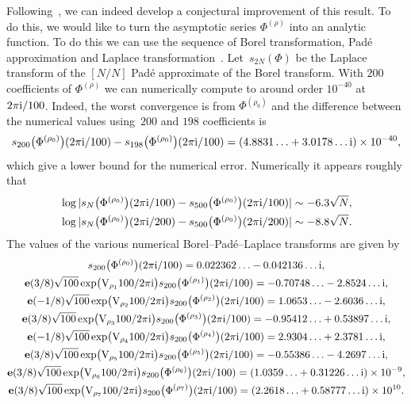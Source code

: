 \documentclass[pdftex]{sigma}
\numberwithin{equation}{section}
\def\be{\begin{equation}}
\def\ee{\end{equation}}
\def\e{\mathbf e}
\def\VC{\mathrm{VC}}
\def\be{\begin{equation}}
\def\ee{\end{equation}}
\def\VC{\mathrm{V}}
\def\triv{\rho_0}
\begin{document}
Following~\cite{GZ:RQMOD}, we can indeed develop a conjectural improvement of this result. To do this, we would like to turn the asymptotic series $\Phi^{(\rho)}$ into an analytic function. To do this we can use the sequence of Borel transformation, Pad\'e approximation and Laplace transformation~\cite{Caliceti}. Let~$s_{2N}(\Phi)$ be the Laplace transform of the $[N/N]$ Pad\'e approximate of the Borel transform. With $200$ coefficients of $\Phi^{(\rho)}$ we can numerically compute to around order $10^{-40}$ at $2\pi {\rm i}/100$. Indeed, the worst convergence is from $\Phi^{(\triv)}$ and the difference between the numerical values using~$200$ and $198$ coefficients is
\be\label{Bor.err}
 s_{200}\bigl(\Phi^{(\triv)}\bigr)(2\pi {\rm i}/100)-s_{198}\bigl(\Phi^{(\triv)}\bigr)(2\pi {\rm i}/100)
  =
 (4.8831\ldots + 3.0178\dots {\rm i})\times 10^{-40} ,
\ee
which give a lower bound for the numerical error. Numerically it appears roughly that
\begin{align*}
& \log|s_{N}\bigl(\Phi^{(\triv)}\bigr)(2\pi {\rm i}/100)-s_{500}\bigl(\Phi^{(\triv)}\bigr)(2\pi {\rm i}/100)|\sim -6.3\sqrt{N},\\
& \log|s_{N}\bigl(\Phi^{(\triv)}\bigr)(2\pi {\rm i}/200)-s_{500}\bigl(\Phi^{(\triv)}\bigr)(2\pi {\rm i}/200)|\sim -8.8\sqrt{N}.
\end{align*}
The values of the various numerical Borel--Pad\'e--Laplace transforms are given by
\begin{gather*}
 s_{200}\bigl(\Phi^{(\rho_0)}\bigr)(2\pi {\rm i}/100)  = 0.022362\ldots - 0.042136\dots {\rm i} ,\\
 \e(3/8)\sqrt{100}\exp \bigl(\VC_{\rho_1}100/2\pi {\rm i} \bigr)s_{200}\bigl(\Phi^{(\rho_1)}\bigr)(2\pi {\rm i}/100)  = -0.70748\ldots - 2.8524\dots {\rm i} ,\\
 \e(-1/8)\sqrt{100}\exp \bigl(\VC_{\rho_2}100/2\pi {\rm i} \bigr)s_{200}\bigl(\Phi^{(\rho_2)}\bigr)(2\pi {\rm i}/100)  = 1.0653\ldots - 2.6036\dots {\rm i} ,\\
 \e(3/8)\sqrt{100}\exp \bigl(\VC_{\rho_3}100/2\pi {\rm i} \bigr)s_{200}\bigl(\Phi^{(\rho_3)}\bigr)(2\pi {\rm i}/100)  = -0.95412\ldots + 0.53897\dots {\rm i} ,\\
 \e(-1/8)\sqrt{100}\exp \bigl(\VC_{\rho_4}100/2\pi {\rm i} \bigr)s_{200}\bigl(\Phi^{(\rho_4)}\bigr)(2\pi {\rm i}/100)  = 2.9304\ldots + 2.3781\dots {\rm i} ,\\
 \e(3/8)\sqrt{100}\exp \bigl(\VC_{\rho_5}100/2\pi {\rm i} \bigr)s_{200}\bigl(\Phi^{(\rho_5)}\bigr)(2\pi {\rm i}/100)  = -0.55386\ldots - 4.2697\dots {\rm i} ,\\
 \e(3/8)\sqrt{100}\exp \bigl(\VC_{\rho_6}100/2\pi {\rm i} \bigr)s_{200}\bigl(\Phi^{(\rho_6)}\bigr)(2\pi {\rm i}/100)  = (1.0359\ldots + 0.31226\dots {\rm i})\times 10^{-9},\\
 \e(3/8)\sqrt{100}\exp \bigl(\VC_{\rho_7}100/2\pi {\rm i} \bigr)s_{200}\bigl(\Phi^{(\rho_7)}\bigr)(2\pi {\rm i}/100)  = (2.2618\ldots + 0.58777\dots {\rm i})\times 10^{10}.
\end{gather*}
\end{document}
